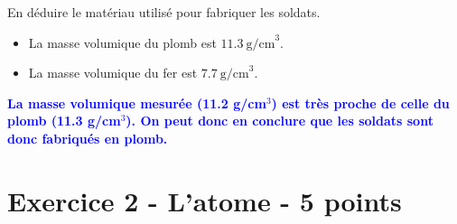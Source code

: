\documentclass[answers]{exam}
\begin{document}
\begin{questions}
  \question[0.5] En déduire le matériau utilisé pour fabriquer les soldats.
  \begin{solution}
    \begin{itemize}[noitemsep]
      \item La masse volumique du plomb est \( 11.3 \ \text{g/cm}^3 \).
      \item La masse volumique du fer est \( 7.7 \ \text{g/cm}^3 \).
    \end{itemize}

    \textcolor{blue}{\textbf{La masse volumique mesurée (11.2 g/cm$^3$) est très proche de celle du plomb (11.3 g/cm$^3$). On peut donc en conclure que les soldats sont donc fabriqués en plomb.}} 
  \end{solution}
\end{questions}

\section*{Exercice 2 - L'atome - 5 points}
\end{document}
